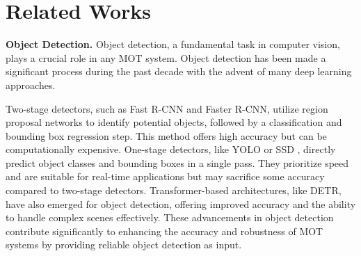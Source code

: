 \section{Related Works}
\label{related-works}

\textbf{Object Detection.} Object detection, a fundamental task in computer vision, plays a crucial role in any MOT system. Object detection has been made a significant process during the past decade with the advent of many deep learning approaches. 

Two-stage detectors, such as Fast R-CNN\cite{girshickFastRcnn2015} and Faster R-CNN\cite{shouxinrenFasterRCNNRealtime2015}, utilize region proposal networks to identify potential objects, followed by a classification and bounding box regression step. This method offers high accuracy but can be computationally expensive. One-stage detectors, like YOLO \cite{redmonYouOnlyLook2016, wangYolov10RealtimeEndtoend2024, jocherYOLOUltralytics2023} or SSD \cite{liuSsdSingleShot2016}, directly predict object classes and bounding boxes in a single pass. They prioritize speed and are suitable for real-time applications but may sacrifice some accuracy compared to two-stage detectors. Transformer-based architectures, like DETR, have also emerged for object detection, offering improved accuracy and the ability to handle complex scenes effectively. These advancements in object detection contribute significantly to enhancing the accuracy and robustness of MOT systems by providing reliable object detection as input.

